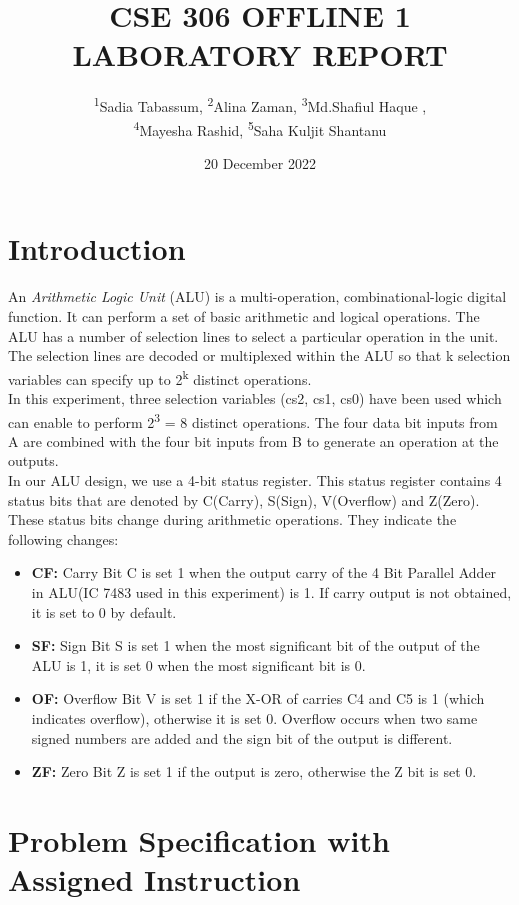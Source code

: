 \documentclass[12pt]{article}
\title{CSE 306 OFFLINE 1 LABORATORY REPORT}
\author{\textsuperscript{1}Sadia Tabassum, \textsuperscript{2}Alina Zaman, \textsuperscript{3}Md.Shafiul Haque ,\\\textsuperscript{4}Mayesha Rashid, \textsuperscript{5}Saha Kuljit Shantanu}
\date{20 December 2022}
\begin{document}
\maketitle

\section{Introduction}
An \textit{Arithmetic Logic Unit} (ALU) is a multi-operation, combinational-logic digital function. It can perform a set of basic arithmetic and logical operations. The ALU has a number of selection lines to select a particular operation in the unit. The selection lines are decoded or multiplexed
within the ALU so that k selection variables can specify up to 2\textsuperscript{k} distinct operations.\\

In this experiment, three selection variables (cs2, cs1, cs0) have been used which can enable to perform 2\textsuperscript{3} = 8 distinct operations. The four data bit inputs from A are combined with the four bit inputs from B to generate an operation at the outputs. \\

In our ALU design, we use a 4-bit status register. This status register contains 4 status bits that are denoted by C(Carry), S(Sign), V(Overflow) and Z(Zero). These status bits change during arithmetic operations. They indicate the following changes:
\begin{itemize}
    \item[\ding{227}] \textbf{CF:} Carry Bit C is set 1 when the output carry of the 4 Bit Parallel Adder in ALU(IC 7483 used in this experiment) is 1. If carry output is not obtained, it is set to 0 by default.
    \item[\ding{227}] \textbf{SF:} Sign Bit S is set 1 when the most significant bit of the output of the ALU is 1, it is set 0 when the most significant bit is 0. 
    \item[\ding{227}] \textbf{OF:} Overflow Bit V is set 1 if the X-OR of carries C4 and C5 is 1 (which indicates overflow), otherwise it is set 0. Overflow occurs when two same signed numbers are added and the sign bit of the output is different.
    \item[\ding{227}] \textbf{ZF:} Zero Bit Z is set 1 if the output is zero, otherwise the Z bit is set 0.
\end{itemize}


\section{Problem Specification with Assigned Instruction}
\end{document}
